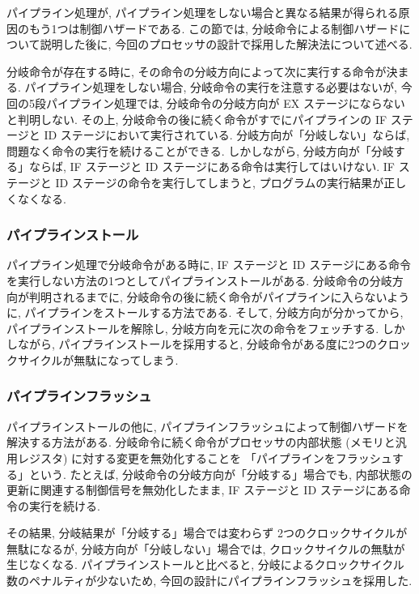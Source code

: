 \documentclass[../specifications.tex]{subfiles}
\begin{document}
  パイプライン処理が, 
  パイプライン処理をしない場合と異なる結果が得られる原因のもう1つは制御ハザードである.
  この節では, 分岐命令による制御ハザードについて説明した後に, 
  今回のプロセッサの設計で採用した解決法について述べる.

  分岐命令が存在する時に, その命令の分岐方向によって次に実行する命令が決まる.
  パイプライン処理をしない場合, 分岐命令の実行を注意する必要はないが, 
  今回の5段パイプライン処理では, 分岐命令の分岐方向が EX ステージにならないと判明しない.
  その上, 分岐命令の後に続く命令がすでにパイプラインの IF ステージと ID ステージにおいて実行されている.
  分岐方向が「分岐しない」ならば, 問題なく命令の実行を続けることができる.
  しかしながら, 分岐方向が「分岐する」ならば, IF ステージと ID ステージにある命令は実行してはいけない.
  IF ステージと ID ステージの命令を実行してしまうと, プログラムの実行結果が正しくなくなる.

  \subsubsection{パイプラインストール}
  パイプライン処理で分岐命令がある時に, 
  IF ステージと ID ステージにある命令を実行しない方法の1つとしてパイプラインストールがある.
  分岐命令の分岐方向が判明されるまでに, 分岐命令の後に続く命令がパイプラインに入らないように, 
  パイプラインをストールする方法である.
  そして, 分岐方向が分かってから, パイプラインストールを解除し, 
  分岐方向を元に次の命令をフェッチする.
  しかしながら, パイプラインストールを採用すると, 
  分岐命令がある度に2つのクロックサイクルが無駄になってしまう.

  \subsubsection{パイプラインフラッシュ}
  パイプラインストールの他に, パイプラインフラッシュによって制御ハザードを解決する方法がある.
  分岐命令に続く命令がプロセッサの内部状態 (メモリと汎用レジスタ) に対する変更を無効化することを
  「パイプラインをフラッシュする」という.
  たとえば, 分岐命令の分岐方向が「分岐する」場合でも, 
  内部状態の更新に関連する制御信号を無効化したまま, 
  IF ステージと ID ステージにある命令の実行を続ける.

  その結果, 分岐結果が「分岐する」場合では変わらず 2つのクロックサイクルが無駄になるが, 
  分岐方向が「分岐しない」場合では, クロックサイクルの無駄が生じなくなる.
  パイプラインストールと比べると, 分岐によるクロックサイクル数のペナルティが少ないため, 
  今回の設計にパイプラインフラッシュを採用した.
\end{document}
